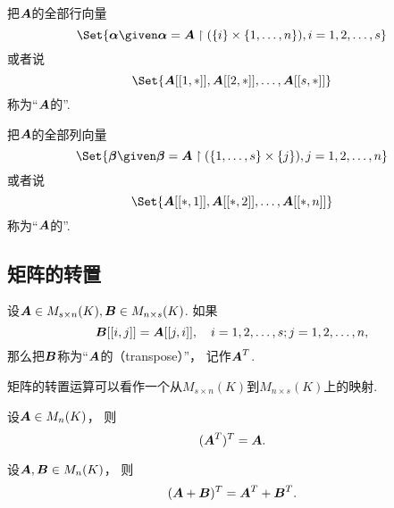把\(\boldsymbol{A}\)的全部行向量\begin{equation*}
	\Set{ \vb\alpha \given \vb\alpha=\vb{A}\SetRestrict(\{i\}\times\{1,\dotsc,n\}), i=1,2,\dotsc,s }
\end{equation*}或者说\begin{equation*}
	\Set{\MatrixEntry{\vb{A}}{1,*},\MatrixEntry{\vb{A}}{2,*},\dotsc,\MatrixEntry{\vb{A}}{s,*}}
\end{equation*}
称为“\(\boldsymbol{A}\)的”.

把\(\boldsymbol{A}\)的全部列向量\begin{equation*}
	\Set{ \vb\beta \given \vb\beta=\vb{A}\SetRestrict(\{1,\dotsc,s\}\times\{j\}), j=1,2,\dotsc,n }
\end{equation*}或者说\begin{equation*}
	\Set{\MatrixEntry{\vb{A}}{*,1},\MatrixEntry{\vb{A}}{*,2},\dotsc,\MatrixEntry{\vb{A}}{*,n}}
\end{equation*}
称为“\(\boldsymbol{A}\)的”.

\subsection{矩阵的转置}
\begin{definition}
设\(\boldsymbol{A} \in M_{s \times n}(K),
\boldsymbol{B}\in M_{n \times s}(K)\).
如果\begin{equation*}
	\boldsymbol{B}[[i,j]]
	= \boldsymbol{A}[[j,i]],
	\quad i=1,2,\dotsc,s;j=1,2,\dotsc,n,
\end{equation*}
那么把\(\boldsymbol{B}\)称为“\(\boldsymbol{A}\)的（transpose）”，
记作\(\boldsymbol{A}^T\).
\end{definition}
\begin{remark}
矩阵的转置运算可以看作一个从\(M_{s \times n}(K)\)到\(M_{n \times s}(K)\)上的映射.
\end{remark}

\begin{property}\label{theorem:矩阵的转置.性质1}
设\(\boldsymbol{A} \in M_n(K)\)，
则\begin{equation}
	(\boldsymbol{A}^T)^T = \boldsymbol{A}.
\end{equation}
\end{property}

\begin{property}\label{theorem:矩阵的转置.性质2}
设\(\boldsymbol{A},\boldsymbol{B} \in M_n(K)\)，
则\begin{equation}
	(\boldsymbol{A}+\boldsymbol{B})^T = \boldsymbol{A}^T + \boldsymbol{B}^T.
\end{equation}
\end{property}

